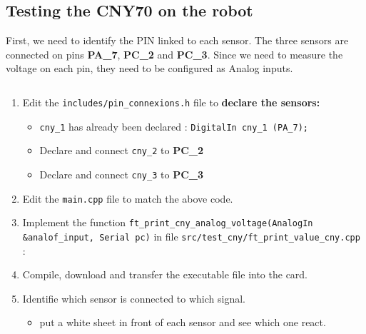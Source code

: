 \subsection{Testing the CNY70 on the robot}

First, we need to identify the PIN linked to each sensor. The three sensors are connected on pins \textbf{PA\_7}, \textbf{PC\_2} and \textbf{PC\_3}.
Since we need to measure the voltage on each pin, they need to be configured as Analog inputs.

\inputminted[firstline=44, lastline=53]{C}{programmes/main.cpp}


\begin{UPSTIactivite}
 \begin{enumerate}
  \item Edit the \texttt{includes/pin_connexions.h} file to \textbf{declare the sensors:}
        \begin{itemize}
         \item \texttt{cny_1} has already been declared : \texttt{DigitalIn cny_1 (PA_7);}
         \item Declare and connect \texttt{cny_2} to \textbf{PC\_2}
         \item Declare and connect \texttt{cny_3} to  \textbf{PC\_3}
        \end{itemize}
  \item Edit the \texttt{main.cpp} file to match the above code.
  \item Implement the function \texttt{ft_print_cny_analog_voltage(AnalogIn &analof_input, Serial pc)} in file \texttt{src/test_cny/ft_print_value_cny.cpp} :
  \item Compile, download and transfer the executable file into the card.
  \item Identifie which sensor is connected to which signal.
        \begin{itemize}
         \item put a white sheet in front of each sensor and see which one react.
        \end{itemize}
 \end{enumerate}
\end{UPSTIactivite}
